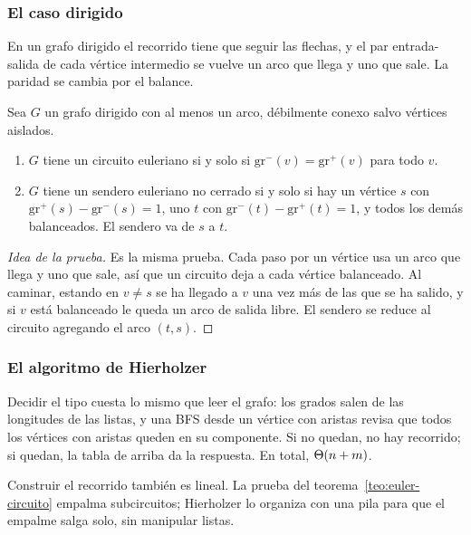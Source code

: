 \documentclass[11pt,letterpaper]{article}
\begin{document}
\subsubsection*{El caso dirigido}

En un grafo dirigido el recorrido tiene que seguir las flechas, y el
par entrada-salida de cada vértice intermedio se vuelve un arco que
llega y uno que sale. La paridad se cambia por el balance.

\begin{teorema}
  \label{teo:euler-dirigido}
  Sea $G$ un grafo dirigido con al menos un arco, débilmente conexo
  salvo vértices aislados.
  \begin{enumerate}[itemsep=0.1em]
    \item $G$ tiene un circuito euleriano si y solo si
          $\text{gr}^{-}(v) = \text{gr}^{+}(v)$ para todo $v$.
    \item $G$ tiene un sendero euleriano no cerrado si y solo si hay un
          vértice $s$ con $\text{gr}^{+}(s) - \text{gr}^{-}(s) = 1$, uno
          $t$ con $\text{gr}^{-}(t) - \text{gr}^{+}(t) = 1$, y todos
          los demás balanceados. El sendero va de $s$ a $t$.
  \end{enumerate}
\end{teorema}

\begin{proof}[Idea de la prueba]
  Es la misma prueba. Cada paso por un vértice usa un arco que llega y
  uno que sale, así que un circuito deja a cada vértice balanceado. Al
  caminar, estando en $v \neq s$ se ha llegado a $v$ una vez más de las
  que se ha salido, y si $v$ está balanceado le queda un arco de salida
  libre. El sendero se reduce al circuito agregando el arco $(t, s)$.
\end{proof}

\subsubsection*{El algoritmo de Hierholzer}

Decidir el tipo cuesta lo mismo que leer el grafo: los grados salen
de las longitudes de las listas, y una BFS desde un vértice con
aristas revisa que todos los vértices con aristas queden en su
componente. Si no quedan, no hay recorrido; si quedan, la tabla de
arriba da la respuesta. En total, $\Theta\!\left(n + m\right)$.

Construir el recorrido también es lineal. La prueba del
teorema~\ref{teo:euler-circuito} empalma subcircuitos; Hierholzer lo
organiza con una pila para que el empalme salga solo, sin manipular
listas.
\end{document}
